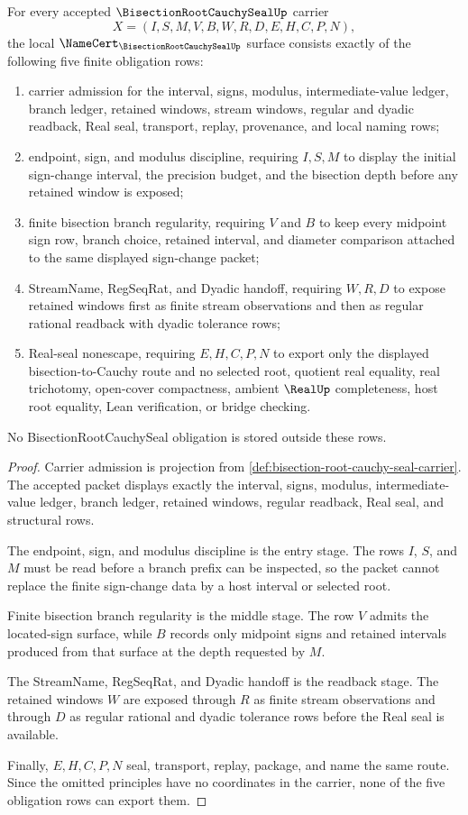 \begin{theorem}
\label{thm:bisection-root-cauchy-seal-namecert-obligations}
For every accepted $\BisectionRootCauchySealUp$ carrier
$$
X=(I,S,M,V,B,W,R,D,E,H,C,P,N),
$$
the local $\NameCert_{\BisectionRootCauchySealUp}$ surface consists exactly of the following five finite obligation rows:
\begin{enumerate}
\item carrier admission for the interval, signs, modulus, intermediate-value ledger, branch ledger, retained windows, stream windows, regular and dyadic readback, Real seal, transport, replay, provenance, and local naming rows;
\item endpoint, sign, and modulus discipline, requiring $I,S,M$ to display the initial sign-change interval, the precision budget, and the bisection depth before any retained window is exposed;
\item finite bisection branch regularity, requiring $V$ and $B$ to keep every midpoint sign row, branch choice, retained interval, and diameter comparison attached to the same displayed sign-change packet;
\item StreamName, RegSeqRat, and Dyadic handoff, requiring $W,R,D$ to expose retained windows first as finite stream observations and then as regular rational readback with dyadic tolerance rows;
\item Real-seal nonescape, requiring $E,H,C,P,N$ to export only the displayed bisection-to-Cauchy route and no selected root, quotient real equality, real trichotomy, open-cover compactness, ambient $\RealUp$ completeness, host root equality, Lean verification, or bridge checking.
\end{enumerate}
No BisectionRootCauchySeal obligation is stored outside these rows.
\end{theorem}
\begin{proof}
Carrier admission is projection from \autoref{def:bisection-root-cauchy-seal-carrier}. The accepted packet displays exactly the interval, signs, modulus, intermediate-value ledger, branch ledger, retained windows, regular readback, Real seal, and structural rows.

The endpoint, sign, and modulus discipline is the entry stage. The rows $I$, $S$, and $M$ must be read before a branch prefix can be inspected, so the packet cannot replace the finite sign-change data by a host interval or selected root.

Finite bisection branch regularity is the middle stage. The row $V$ admits the located-sign surface, while $B$ records only midpoint signs and retained intervals produced from that surface at the depth requested by $M$.

The StreamName, RegSeqRat, and Dyadic handoff is the readback stage. The retained windows $W$ are exposed through $R$ as finite stream observations and through $D$ as regular rational and dyadic tolerance rows before the Real seal is available.

Finally, $E,H,C,P,N$ seal, transport, replay, package, and name the same route. Since the omitted principles have no coordinates in the carrier, none of the five obligation rows can export them.
\end{proof}

